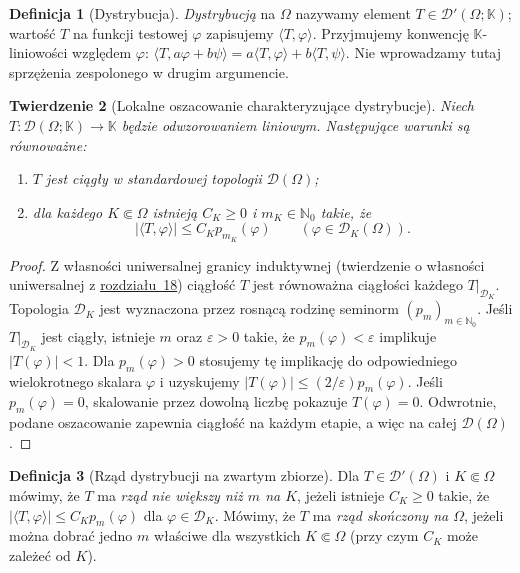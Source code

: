 \documentclass[11pt,a4paper]{article}
\numberwithin{equation}{section}
\theoremstyle{plain}
\newtheorem{twierdzenie}{Twierdzenie}[section]
\theoremstyle{definition}
\newtheorem{definicja}[twierdzenie]{Definicja}
\theoremstyle{remark}
\newcommand{\N}{\mathbb N}
\newcommand{\K}{\mathbb K}
\begin{document}
\begin{definicja}[Dystrybucja]
\label{def:distribution19}
\emph{Dystrybucją} na $\Omega$ nazywamy element
$T\in\mathcal D'(\Omega;\K)$; wartość $T$ na funkcji
testowej $\varphi$ zapisujemy $\langle T,\varphi\rangle$.
Przyjmujemy konwencję $\K$-liniowości względem $\varphi$:
$\langle T,a\varphi+b\psi\rangle=a\langle T,\varphi\rangle+
b\langle T,\psi\rangle$. Nie wprowadzamy tutaj sprzężenia
zespolonego w drugim argumencie.
\end{definicja}

\begin{twierdzenie}[Lokalne oszacowanie charakteryzujące dystrybucje]
\label{thm:distribution-estimate19}
Niech $T:\mathcal D(\Omega;\K)\to\K$ będzie odwzorowaniem
liniowym. Następujące warunki są równoważne:
\begin{enumerate}
\item $T$ jest ciągły w standardowej topologii $\mathcal D(\Omega)$;
\item dla każdego $K\Subset\Omega$ istnieją $C_K\ge0$
i $m_K\in\N_0$ takie, że
\[|\langle T,\varphi\rangle|\le C_K p_{m_K}(\varphi)
\qquad(\varphi\in\mathcal D_K(\Omega)).\]
\end{enumerate}
\end{twierdzenie}
\begin{proof}
Z własności uniwersalnej granicy induktywnej
(twierdzenie o własności uniwersalnej z \hyperref[sec:funkcje-testowe18]{rozdziału~18}) ciągłość $T$
jest równoważna ciągłości każdego
$T|_{\mathcal D_K}$. Topologia $\mathcal D_K$ jest wyznaczona
przez rosnącą rodzinę seminorm $(p_m)_{m\in\N_0}$.
Jeśli $T|_{\mathcal D_K}$ jest ciągły, istnieje $m$ oraz
$\varepsilon>0$ takie, że $p_m(\varphi)<\varepsilon$
implikuje $|T(\varphi)|<1$. Dla $p_m(\varphi)>0$ stosujemy
tę implikację do odpowiedniego wielokrotnego skalara
$\varphi$ i uzyskujemy $|T(\varphi)|\le(2/\varepsilon)p_m(\varphi)$.
Jeśli $p_m(\varphi)=0$, skalowanie przez dowolną liczbę
pokazuje $T(\varphi)=0$. Odwrotnie, podane oszacowanie
zapewnia ciągłość na każdym etapie, a więc na całej
$\mathcal D(\Omega)$.
\end{proof}

\begin{definicja}[Rząd dystrybucji na zwartym zbiorze]
\label{def:order19}
Dla $T\in\mathcal D'(\Omega)$ i $K\Subset\Omega$ mówimy,
że $T$ ma \emph{rząd nie większy niż $m$ na $K$}, jeżeli
istnieje $C_K\ge0$ takie, że
$|\langle T,\varphi\rangle|\le C_K p_m(\varphi)$
dla $\varphi\in\mathcal D_K$. Mówimy, że $T$ ma
\emph{rząd skończony na $\Omega$}, jeżeli można dobrać
jedno $m$ właściwe dla wszystkich $K\Subset\Omega$
(przy czym $C_K$ może zależeć od $K$).
\end{definicja}
\end{document}
